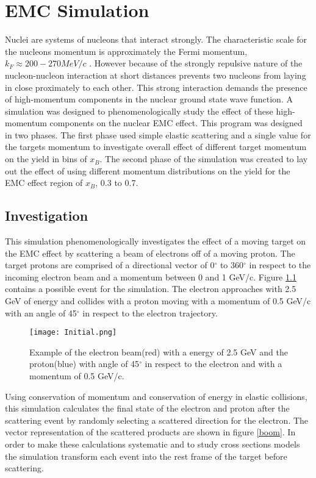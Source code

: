 
\chapter{EMC Simulation}Nuclei are systems of nucleons that interact strongly. The characteristic scale for the nucleons momentum is approximately the Fermi momentum, $k_F \approx 200-270 MeV/c$ \cite{gomez}. However because of the strongly repulsive nature of the nucleon-nucleon interaction at short distances prevents two nucleons from laying in close proximately to each other. This strong interaction demands the presence of high-momentum components in the nuclear ground state wave function. A simulation was designed to phenomenologically study the effect of these high-momentum components on the nuclear EMC effect. This program was designed in two phases. The first phase used simple elastic scattering and a single value for the targets momentum to investigate overall effect of different target momentum on the yield in bins of $x_B$. The second phase of the simulation was created to lay out the effect of using different momentum distributions on the yield for the EMC effect region of $x_B$, 0.3 to 0.7.
\section{Investigation} This simulation phenomenologically investigates the effect of a moving target on the EMC effect by scattering a beam of electrons off of a moving proton. The target protons are comprised of a directional vector of 0$^\circ$ to 360$^\circ$ in respect to the incoming electron beam and a momentum between 0 and 1 GeV/c. Figure \ref{example} contains a possible event for the simulation. The electron approaches with 2.5 GeV of energy and collides with a proton moving with a momentum of 0.5 GeV/c with an angle of 45$^\circ$ in respect to the electron trajectory. 
\begin{figure}[h]
\centering
\caption{Example of the electron beam(red) with a energy of 2.5 GeV and the proton(blue) with angle of 45$^\circ$ in respect to the electron and with a momentum of 0.5 GeV/c.}
\texttt{[image: Initial.png]}
\label{example}
\end{figure}

Using conservation of momentum and conservation of energy in elastic collisions, this simulation calculates the final state of the electron and proton after the scattering event by randomly selecting a scattered direction for the electron. The vector representation of the scattered products are shown in figure \ref{boom}. In order to make these calculations systematic and to study cross sections models the simulation transform each event into the rest frame of the target before scattering. 

